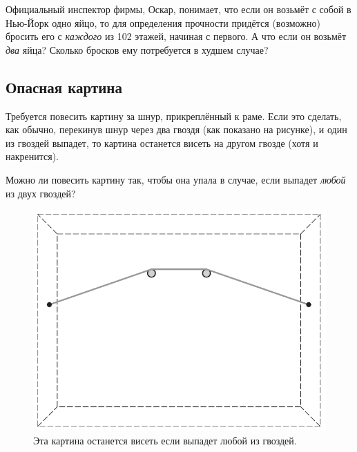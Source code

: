Официальный инспектор фирмы, Оскар, понимает, что если он возьмёт с собой в Нью-Йорк одно яйцо,
то для определения прочности придётся (возможно) бросить его с \emph{каждого} из 102 %
этажей, начиная с первого.
А что если он возьмёт \emph{два} яйца?
Сколько бросков ему потребуется в худшем случае?



\subsection*{Опасная картина}

Требуется повесить картину за шнур, прикреплённый к раме.
Если это сделать, как обычно, перекинув шнур через два гвоздя (как показано на рисунке), и один из гвоздей выпадет, то картина останется висеть на другом гвозде (хотя и накренится).

Можно ли повесить картину так, чтобы она упала в случае, если выпадет \emph{любой} из двух гвоздей?

\begin{figure}[h!]
\centering
\includegraphics[scale=0.5]{pics/kartina1}
\caption{Эта картина останется висеть если выпадет любой из гвоздей.}
\label{pic:kartina1}
\end{figure}

